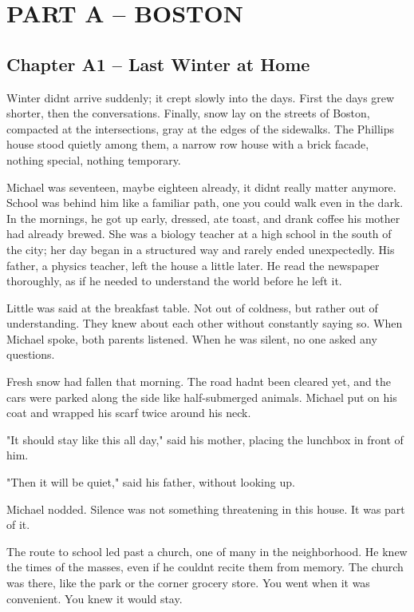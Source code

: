 \documentclass[
]{article}
\begin{document}
\section{PART A -- BOSTON}\label{part-a-boston}

\subsection{Chapter A1 -- Last Winter at Home}\label{chapter-a1-last-winter-at-home}

Winter didn\textquotesingle t arrive suddenly; it crept slowly into the days. First the days grew shorter, then the conversations. Finally, snow lay on the streets of Boston, compacted at the intersections, gray at the edges of the sidewalks. The Phillips house stood quietly among them, a narrow row house with a brick facade, nothing special, nothing temporary.

Michael was seventeen, maybe eighteen already, it didn\textquotesingle t really matter anymore. School was behind him like a familiar path, one you could walk even in the dark. In the mornings, he got up early, dressed, ate toast, and drank coffee his mother had already brewed. She was a biology teacher at a high school in the south of the city; her day began in a structured way and rarely ended unexpectedly. His father, a physics teacher, left the house a little later. He read the newspaper thoroughly, as if he needed to understand the world before he left it.

Little was said at the breakfast table. Not out of coldness, but rather out of understanding. They knew about each other without constantly saying so. When Michael spoke, both parents listened. When he was silent, no one asked any questions.

Fresh snow had fallen that morning. The road hadn\textquotesingle t been cleared yet, and the cars were parked along the side like half-submerged animals. Michael put on his coat and wrapped his scarf twice around his neck.

"It should stay like this all day," said his mother, placing the lunchbox in front of him.

"Then it will be quiet," said his father, without looking up.

Michael nodded. Silence was not something threatening in this house. It was part of it.

The route to school led past a church, one of many in the neighborhood. He knew the times of the masses, even if he couldn\textquotesingle t recite them from memory. The church was there, like the park or the corner grocery store. You went when it was convenient. You knew it would stay.
\end{document}
